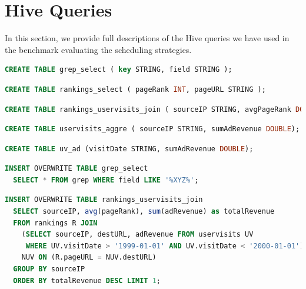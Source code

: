 \documentclass[11pt,a4paper,twoside]{report}
\begin{document}
\section{Hive Queries}
In this section, we provide full descriptions of the Hive queries we have used in the benchmark evaluating the scheduling strategies.\\

\begin{lstlisting}[language=SQL, caption={Create Grep select table}, label={lst:CreateGrepSel}]
CREATE TABLE grep_select ( key STRING, field STRING );
\end{lstlisting}

\begin{lstlisting}[language=SQL, caption={Create Rankings select table}, label={lst:CreateRankingSel}]
CREATE TABLE rankings_select ( pageRank INT, pageURL STRING );
\end{lstlisting}

\begin{lstlisting}[language=SQL, caption={Create UserVisits join table}, label={lst:CreateUVJoin}]
CREATE TABLE rankings_uservisits_join ( sourceIP STRING, avgPageRank DOUBLE, totalRevenue DOUBLE);
\end{lstlisting}

\begin{lstlisting}[language=SQL, caption={Create UserVisits aggregation table}, label={lst:CreateUVAgg}]
CREATE TABLE uservisits_aggre ( sourceIP STRING, sumAdRevenue DOUBLE);
\end{lstlisting}

\begin{lstlisting}[language=SQL, caption={Create UserVisits ads table}, label={lst:CreateUVAd}]
CREATE TABLE uv_ad (visitDate STRING, sumAdRevenue DOUBLE);
\end{lstlisting}

\begin{lstlisting}[language=SQL, caption={Selects entries that contains XYZ}, label={lst:Grep}]
INSERT OVERWRITE TABLE grep_select
  SELECT * FROM grep WHERE field LIKE '%XYZ%';
\end{lstlisting}

\begin{lstlisting}[language=SQL, caption={Joins Rankings and UserVisits tables}, label={lst:JoinUV}]
INSERT OVERWRITE TABLE rankings_uservisits_join
  SELECT sourceIP, avg(pageRank), sum(adRevenue) as totalRevenue
  FROM rankings R JOIN
    (SELECT sourceIP, destURL, adRevenue FROM uservisits UV
     WHERE UV.visitDate > '1999-01-01' AND UV.visitDate < '2000-01-01')
    NUV ON (R.pageURL = NUV.destURL)
  GROUP BY sourceIP
  ORDER BY totalRevenue DESC LIMIT 1;
\end{lstlisting}
\end{document}
